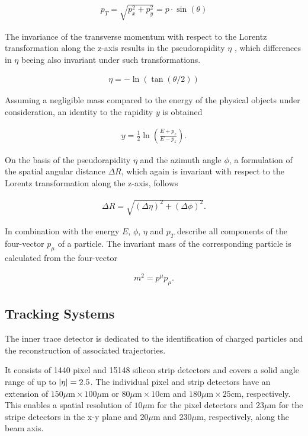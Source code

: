 \documentclass[12pt, a4paper]{thesis}
\begin{document}
\begin{align}
  p_T = \sqrt{p_x^2 + p_y^2} = p \cdot \sin(\theta)
\end{align}

The invariance of the transverse momentum with respect to the Lorentz
transformation along the z-axis results in the pseudorapidity \(\eta\)
, which differences in $\eta$ beeing also invariant under such
transformations.

\begin{align}
  \eta = - \ln(\tan(\theta/2))
\end{align}

Assuming a negligible mass compared to the energy of the physical
objects under consideration, an identity to the rapidity $y$ is obtained

\begin{align}
  y = \frac{1}{2} \ln(\frac{E+p_z}{E-p_z}).
\end{align}

On the basis of the pseudorapidity \(\eta\) and the azimuth angle
\(\phi\), a formulation of the spatial angular distance \(\Delta R\),
which again is invariant with respect to the Lorentz transformation
along the z-axis, follows

\begin{align}
  \Delta R = \sqrt{(\Delta \eta)^{2} + (\Delta \phi)^{2}}.
\end{align}

In combination with the energy \(E\), \(\phi\), \(\eta\) and \(p_{T}\)
describe all components of the four-vector \(p_{\mu}\) of a
particle. The invariant mass of the corresponding particle is
calculated from the four-vector

\begin{align}
  m^{2} = p^{\mu}p_{\mu}.
\end{align}

\subsection{Tracking Systems}
\label{sec:org139ed11}
The inner trace detector is dedicated to the identification of charged
particles and the reconstruction of associated trajectories.

It consists of 1440 pixel and 15148 silicon strip detectors and covers
a solid angle range of up to \(\abs{\eta} = 2.5\). The individual
pixel and strip detectors have an extension of \(150\mu \text{m}
\times 100 \mu \text{m}\) or \(80\mu \text{m} \times 10 \text{cm}\)
and \(180\mu \text{m} \times 25 \text{cm}\), respectively.  This
enables a spatial resolution of \(10\mu \text{m}\) for the pixel
detectors and \(23\mu \text{m}\) for the stripe detectors in the x-y
plane and \(20\mu \text{m}\) and \(230\mu \text{m}\), respectively,
along the beam axis.
\end{document}
